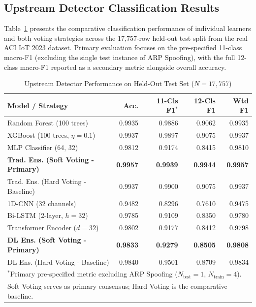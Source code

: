 \documentclass[conference]{IEEEtran}
\begin{document}
\subsection{Upstream Detector Classification Results}
Table~\ref{tab:detector_perf} presents the comparative classification performance of individual learners and both voting strategies across the 17,757-row held-out test split from the real ACI IoT 2023 dataset. Primary evaluation focuses on the pre-specified 11-class macro-F1 (excluding the single test instance of ARP Spoofing), with the full 12-class macro-F1 reported as a secondary metric alongside overall accuracy.

\begin{table}[htbp]
\caption{Upstream Detector Performance on Held-Out Test Set ($N=17,757$)}
\begin{center}
\begin{tabularx}{\columnwidth}{lrrrr}
\toprule
\textbf{Model / Strategy} & \textbf{Acc.} & \textbf{11-Cls F1$^*$} & \textbf{12-Cls F1} & \textbf{Wtd F1} \\
\midrule
Random Forest (100 trees) & 0.9935 & 0.9886 & 0.9062 & 0.9935 \\
XGBoost (100 trees, $\eta=0.1$) & 0.9937 & 0.9897 & 0.9075 & 0.9937 \\
MLP Classifier (64, 32) & 0.9812 & 0.9174 & 0.8415 & 0.9810 \\
\textbf{Trad. Ens. (Soft Voting - Primary)} & \textbf{0.9957} & \textbf{0.9939} & \textbf{0.9944} & \textbf{0.9957} \\
Trad. Ens. (Hard Voting - Baseline) & 0.9937 & 0.9900 & 0.9075 & 0.9937 \\
\midrule
1D-CNN (32 channels) & 0.9482 & 0.8296 & 0.7610 & 0.9475 \\
Bi-LSTM (2-layer, $h=32$) & 0.9785 & 0.9109 & 0.8350 & 0.9780 \\
Transformer Encoder ($d=32$) & 0.9802 & 0.9177 & 0.8412 & 0.9798 \\
\textbf{DL Ens. (Soft Voting - Primary)} & \textbf{0.9833} & \textbf{0.9279} & \textbf{0.8505} & \textbf{0.9808} \\
DL Ens. (Hard Voting - Baseline) & 0.9840 & 0.9501 & 0.8709 & 0.9834 \\
\bottomrule
\multicolumn{5}{l}{\footnotesize $^*$Primary pre-specified metric excluding ARP Spoofing ($N_{\text{test}}=1$, $N_{\text{train}}=4$).} \\
\multicolumn{5}{l}{\footnotesize Soft Voting serves as primary consensus; Hard Voting is the comparative baseline.}
\end{tabularx}
\label{tab:detector_perf}
\end{center}
\end{table}
\end{document}
